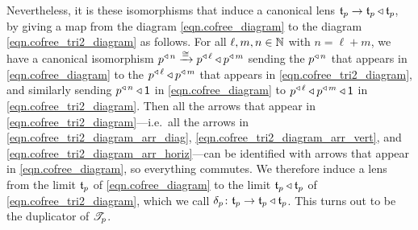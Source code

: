 \documentclass[Book-Poly]{subfiles}
\begin{document}
Nevertheless, it is these isomorphisms that induce a canonical lens $\mathfrak{t}_p\to\mathfrak{t}_p\mathbin{\triangleleft}\mathfrak{t}_p$, by giving a map from the diagram \eqref{eqn.cofree_diagram} to the diagram \eqref{eqn.cofree_tri2_diagram} as follows.
For all $\ell,m,n\in\mathbb{N}$ with $n=\ell+m$, we have a canonical isomorphism $p^{\mathbin{\triangleleft}\,n}\xrightarrow{\cong} p^{\mathbin{\triangleleft}\,\ell}\mathbin{\triangleleft} p^{\mathbin{\triangleleft}\,m}$ sending the $p^{\mathbin{\triangleleft}\,n}$ that appears in \eqref{eqn.cofree_diagram} to the $p^{\mathbin{\triangleleft}\,\ell}\mathbin{\triangleleft} p^{\mathbin{\triangleleft}\,m}$ that appears in \eqref{eqn.cofree_tri2_diagram}, and similarly sending $p^{\mathbin{\triangleleft}\,n}\mathbin{\triangleleft}\textsf{1}$ in \eqref{eqn.cofree_diagram} to $p^{\mathbin{\triangleleft}\,\ell}\mathbin{\triangleleft} p^{\mathbin{\triangleleft}\,m}\mathbin{\triangleleft}\textsf{1}$ in \eqref{eqn.cofree_tri2_diagram}.
Then all the arrows that appear in \eqref{eqn.cofree_tri2_diagram}---i.e.\ all the arrows in \eqref{eqn.cofree_tri2_diagram_arr_diag}, \eqref{eqn.cofree_tri2_diagram_arr_vert}, and \eqref{eqn.cofree_tri2_diagram_arr_horiz}---can be identified with arrows that appear in \eqref{eqn.cofree_diagram}, so everything commutes.
We therefore induce a lens from the limit $\mathfrak{t}_p$ of \eqref{eqn.cofree_diagram} to the limit $\mathfrak{t}_p\mathbin{\triangleleft}\mathfrak{t}_p$ of \eqref{eqn.cofree_tri2_diagram}, which we call $\delta_p\colon\mathfrak{t}_p\to\mathfrak{t}_p\mathbin{\triangleleft}\mathfrak{t}_p$.
This turns out to be the duplicator of $\mathscr{T}_{p}$.
\end{document}
